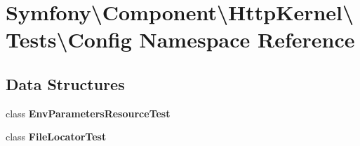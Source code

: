 \section{Symfony\textbackslash{}Component\textbackslash{}Http\+Kernel\textbackslash{}Tests\textbackslash{}Config Namespace Reference}
\label{namespace_symfony_1_1_component_1_1_http_kernel_1_1_tests_1_1_config}
\subsection*{Data Structures}
\begin{DoxyCompactItemize}
\item 
class {\bf Env\+Parameters\+Resource\+Test}
\item 
class {\bf File\+Locator\+Test}
\end{DoxyCompactItemize}
